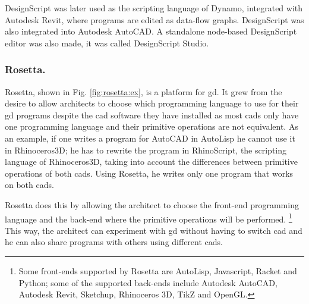 \documentclass{./llncs2e/llncs}
\begin{document}
	
	DesignScript was later used as the scripting language of Dynamo, integrated with Autodesk Revit, where programs are edited as data-flow graphs. 
	DesignScript was also integrated into Autodesk AutoCAD. 
	A standalone node-based DesignScript editor was also made, it was called DesignScript Studio.
	

\subsubsection{Rosetta.}
	Rosetta\cite{de2012modern,lopes2011portable}, shown in Fig. \ref{fig:rosetta:ex}, is a platform for \ac{gd}.
	It grew from the desire to allow architects to choose which programming language to use for their \ac{gd} programs despite the \ac{cad} software they have installed as most \acp{cad} only have one programming language and their primitive operations are not equivalent.
	As an example, if one writes a program for AutoCAD in AutoLisp he cannot use it in Rhinoceros3D; he has to rewrite the program in RhinoScript, the scripting language of Rhinoceros3D, taking into account the differences between primitive operations of both \acp{cad}.
	Using Rosetta, he writes only one program that works on both \acp{cad}.
	
	Rosetta does this by allowing the architect to choose the front-end programming language and the back-end where the primitive operations will be performed.
	\footnote{Some front-ends supported by Rosetta are AutoLisp, Javascript, Racket and Python; some of the supported back-ends include Autodesk AutoCAD, Autodesk Revit, Sketchup, Rhinoceros 3D, TikZ and OpenGL.}
	This way, the architect can experiment with \ac{gd} without having to switch \ac{cad} and he can also share programs with others using different \acp{cad}.
\end{document}

